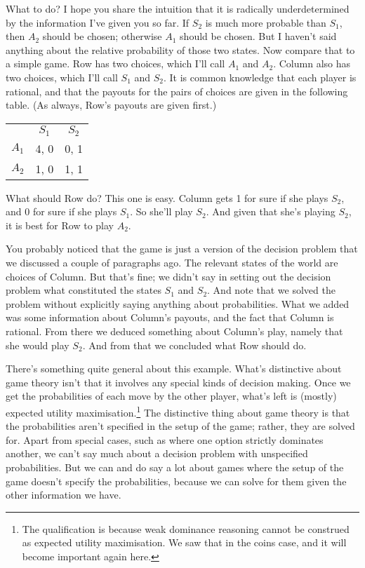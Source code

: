 \documentclass[11pt,]{book}
\let\rmarkdownfootnote\footnote%
\def\footnote{\protect\rmarkdownfootnote}
\def\toprule{}
\def\bottomrule{}
\begin{document}
What to do? I hope you share the intuition that it is radically underdetermined by the information I've given you so far. If \(S_2\) is much more probable than \(S_1\), then \(A_2\) should be chosen; otherwise \(A_1\) should be chosen. But I haven't said anything about the relative probability of those two states. Now compare that to a simple game. Row has two choices, which I'll call \(A_1\) and \(A_2\). Column also has two choices, which I'll call \(S_1\) and \(S_2\). It is common knowledge that each player is rational, and that the payouts for the pairs of choices are given in the following table. (As always, Row's payouts are given first.)

\begin{longtable}[]{@{}lcc@{}}
\toprule
\endhead
& \(S_1\) & \(S_2\)\tabularnewline
\(A_1\) & 4, 0 & 0, 1\tabularnewline
\(A_2\) & 1, 0 & 1, 1\tabularnewline
\bottomrule
\end{longtable}

What should Row do? This one is easy. Column gets 1 for sure if she plays \(S_2\), and 0 for sure if she plays \(S_1\). So she'll play \(S_2\). And given that she's playing \(S_2\), it is best for Row to play \(A_2\).

You probably noticed that the game is just a version of the decision problem that we discussed a couple of paragraphs ago. The relevant states of the world are choices of Column. But that's fine; we didn't say in setting out the decision problem what constituted the states \(S_1\) and \(S_2\). And note that we solved the problem without explicitly saying anything about probabilities. What we added was some information about Column's payouts, and the fact that Column is rational. From there we deduced something about Column's play, namely that she would play \(S_2\). And from that we concluded what Row should do.

There's something quite general about this example. What's distinctive about game theory isn't that it involves any special kinds of decision making. Once we get the probabilities of each move by the other player, what's left is (mostly) expected utility maximisation.\footnote{The qualification is because weak dominance reasoning cannot be construed as expected utility maximisation. We saw that in the coins case, and it will become important again here.} The distinctive thing about game theory is that the probabilities aren't specified in the setup of the game; rather, they are solved for. Apart from special cases, such as where one option strictly dominates another, we can't say much about a decision problem with unspecified probabilities. But we can and do say a lot about games where the setup of the game doesn't specify the probabilities, because we can solve for them given the other information we have.
\end{document}
